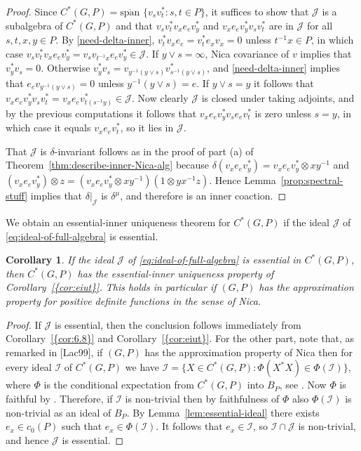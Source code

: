 \documentclass[12pt]{amsart}
\theoremstyle{plain}
\newtheorem{cor}[theorem]{Corollary}
\theoremstyle{remark}
\theoremstyle{definition}
\numberwithin{equation}{section}
\theoremstyle{plain}
\theoremstyle{definition}
\theoremstyle{remark}
\begin{document}
\begin{proof} Since $C^*(G, P)={\operatorname{\overline{span\!}\,\,}}\{v_sv_t^*: s,t\in P\}$, it suffices to show that $\mathcal{J}$ is a subalgebra of $C^*(G, P)$ and that $v_sv_t^*v_xe_ev_y^*$ and $v_xe_ev_y^*v_sv_t^*$
are in $\mathcal{J}$ for all $s,t,x,y\in P$. By \eqref{need-delta-inner}, $v_t^*v_xe_e=v_t^*e_xv_x=0$ unless $t^{-1}x\in P$, in which
case $v_sv_t^*v_xe_ev_y^*=v_sv_{t^{-1}x}e_ev_y^*\in \mathcal{J}$. If $y\vee s=\infty$, Nica covariance of $v$ implies that $v_y^*v_s=0$. Otherwise $v_y^*v_s=v_{y^{-1}(y\vee s)}v_{s^{-1}(y\vee s)}^*$, and  \eqref{need-delta-inner} implies that $e_ev_{y^{-1}(y\vee s)}=0$ unless
$y^{-1}(y\vee s)=e$. If $y\vee s=y$ it follows that $v_xe_ev_y^*v_sv_t^*=v_xe_ev_ {t(s^{-1}y)}^*\in \mathcal{J}$. Now clearly
$\mathcal{J}$ is closed under taking adjoints, and by the previous computations it follows that $v_xe_ev_y^*v_se_ev_t^*$ is
zero unless $s=y$, in which case it equals $v_xe_ev_t^*$, so it lies in $\mathcal{J}$.

That $\mathcal{J}$ is $\delta$-invariant follows as in the proof of part (a) of Theorem~\ref{thm:describe-inner-Nica-alg}  because
 $\delta(v_xe_ev_y^*)=v_xe_ev_y^*\otimes xy^{-1}$ and $(v_xe_ev_y^*)\otimes z=(v_xe_ev_y^*\otimes xy^{-1})(1\otimes yx^{-1}z)$. Hence Lemma~\ref{prop:spectral-stuff} implies that $\delta\vert_{\mathcal{J}}$ is $\delta^\mu$, and therefore is an inner coaction.
\end{proof}

We obtain an essential-inner uniqueness theorem for $C^*(G, P)$ if
the ideal
$\mathcal{J}$
of \eqref{eq:ideal-of-full-algebra}
is  essential.

\begin{cor}
If the ideal
$\mathcal{J}$
of \eqref{eq:ideal-of-full-algebra}
is  essential in $C^*(G, P)$,
then
$C^*(G, P)$ has the essential-inner uniqueness property of {Corollary~\textup{\ref{{cor:eiut}}}}.
This holds in particular if $(G, P)$ has the approximation property for positive definite functions in the sense of Nica.
\end{cor}

\begin{proof}
If $\mathcal{J}$ is essential, then the conclusion follows immediately from {Corollary~\textup{\ref{{cor:6.8}}}} and {Corollary~\textup{\ref{{cor:eiut}}}}.
For the other part, note that,
as remarked in [Lac99], if  $(G, P)$ has the approximation property of Nica then for every ideal $\mathcal{I}$ of $C^*(G, P)$
we have $\mathcal{I}=\{X\in C^*(G, P): \Phi(X^*X)\in \Phi(\mathcal{I})\}$, where $\Phi$ is the conditional expectation  from $C^*(G, P)$ into $B_P$, see \cite[Corollaries 2.4 and 3.3]{LacR1}. Now $\Phi$ is faithful by \cite[\S 4.3 and 4.5]{N}.
Therefore, if $\mathcal{I}$ is non-trivial then by faithfulness of $\Phi$ also $\Phi(\mathcal{I})$ is non-trivial as an ideal of $B_P$. By Lemma~\ref{lem:essential-ideal} there exists  $e_x\in c_0(P)$
such that $e_x\in \Phi(\mathcal{I})$. It follows that  $e_x\in\mathcal{I}$, so $\mathcal{I}\cap \mathcal{J}$ is non-trivial, and hence $\mathcal{J}$ is essential.
\end{proof}
\end{document}
